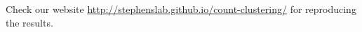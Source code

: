 Check our website \url{http://stephenslab.github.io/count-clustering/} for reproducing the results.






 








